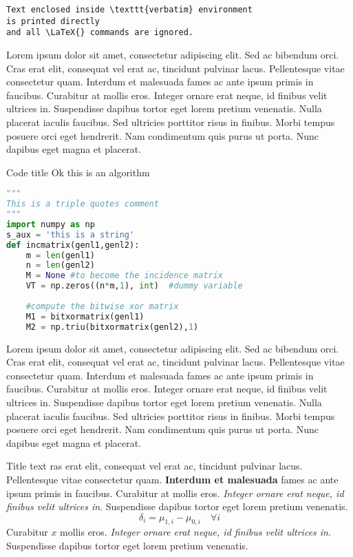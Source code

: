 \documentclass[11pt, a4paper]{report}
\begin{document}
\begin{verbatim}
Text enclosed inside \texttt{verbatim} environment 
is printed directly 
and all \LaTeX{} commands are ignored.
\end{verbatim}

\par Lorem ipsum dolor sit amet, consectetur adipiscing elit. Sed ac bibendum orci. Cras erat elit, consequat vel erat ac, tincidunt pulvinar lacus. Pellentesque vitae consectetur quam. Interdum et malesuada fames ac ante ipsum primis in faucibus. Curabitur at mollis eros. Integer ornare erat neque, id finibus velit ultrices in. Suspendisse dapibus tortor eget lorem pretium venenatis. Nulla placerat iaculis faucibus. Sed ultricies porttitor risus in finibus. Morbi tempus posuere orci eget hendrerit. Nam condimentum quis purus ut porta. Nunc dapibus eget magna et placerat.


\begin{algbox}[
label={mynamelabel},
nameref={Title or anything else}
]{Code title}
Ok this is an algorithm
\tcblower
\begin{lstlisting}[language=Python]
"""
This is a triple quotes comment
"""
import numpy as np
s_aux = 'this is a string'
def incmatrix(genl1,genl2):
    m = len(genl1)
    n = len(genl2)
    M = None #to become the incidence matrix
    VT = np.zeros((n*m,1), int)  #dummy variable
    
    #compute the bitwise xor matrix
    M1 = bitxormatrix(genl1)
    M2 = np.triu(bitxormatrix(genl2),1) 
\end{lstlisting}
\label{box:02}
\end{algbox}

\par Lorem ipsum dolor sit amet, consectetur adipiscing elit. Sed ac bibendum orci. Cras erat elit, consequat vel erat ac, tincidunt pulvinar lacus. Pellentesque vitae consectetur quam. Interdum et malesuada fames ac ante ipsum primis in faucibus. Curabitur at mollis eros. Integer ornare erat neque, id finibus velit ultrices in. Suspendisse dapibus tortor eget lorem pretium venenatis. Nulla placerat iaculis faucibus. Sed ultricies porttitor risus in finibus. Morbi tempus posuere orci eget hendrerit. Nam condimentum quis purus ut porta. Nunc dapibus eget magna et placerat.

\begin{simplebox}[
label={mynamelabel},
nameref={Title or anything else}
]{Title text}
ras erat elit, consequat vel erat ac, tincidunt pulvinar lacus. Pellentesque vitae consectetur quam. \textbf{Interdum et malesuada} fames ac ante ipsum primis in faucibus. Curabitur at mollis eros. \textit{Integer ornare erat neque, id finibus velit ultrices in}. Suspendisse dapibus tortor eget lorem pretium venenatis.
\begin{equation} %
		\label{eq:myeq2}
		\delta_{i} = \mu_{1, i} - \mu_{0, i} \quad \forall i 
\end{equation}
Curabitur $x$ mollis eros. \textit{Integer ornare erat neque, id finibus velit ultrices in}. Suspendisse dapibus tortor eget lorem pretium venenatis.
\label{box:01}
\end{simplebox}
\end{document}
